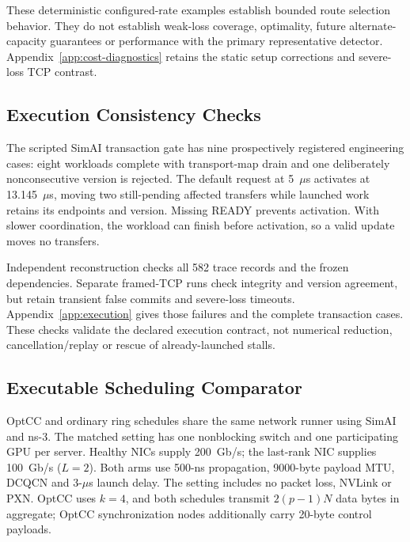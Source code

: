 \documentclass[sigconf]{acmart}
\begin{document}
These deterministic configured-rate examples establish bounded route
selection behavior. They do not establish weak-loss coverage, optimality,
future alternate-capacity guarantees or performance with the primary
representative detector. Appendix~\ref{app:cost-diagnostics} retains the
static setup corrections and severe-loss TCP contrast.

\subsection{Execution Consistency Checks}
\label{sec:execution-results}
The scripted SimAI transaction gate has nine prospectively registered
engineering cases: eight workloads complete with transport-map drain and
one deliberately nonconsecutive version is rejected. The default request
at 5~$\mu$s activates at 13.145~$\mu$s, moving two still-pending affected
transfers while launched work retains its endpoints and version. Missing
READY prevents activation. With slower coordination, the workload can
finish before activation, so a valid update moves no transfers.

Independent reconstruction checks all 582 trace records and the frozen
dependencies. Separate framed-TCP runs check integrity and version
agreement, but retain transient false commits and severe-loss timeouts.
Appendix~\ref{app:execution} gives those failures and the complete transaction
cases. These checks validate the declared execution contract, not numerical
reduction, cancellation/replay or rescue of already-launched stalls.

\subsection{Executable Scheduling Comparator}
\label{sec:baseline-reproduction}
OptCC and ordinary ring schedules share the same network runner using
SimAI and ns-3. The matched setting has one nonblocking switch and one
participating GPU per server. Healthy NICs supply 200~Gb/s; the last-rank
NIC supplies 100~Gb/s ($L=2$). Both arms use 500-ns propagation,
9000-byte payload MTU, DCQCN and 3-$\mu$s launch delay. The setting
includes no packet loss, NVLink or PXN. OptCC uses
$k=4$, and both schedules transmit $2(p-1)N$ data bytes in aggregate;
OptCC synchronization nodes additionally carry 20-byte control payloads.
\end{document}
